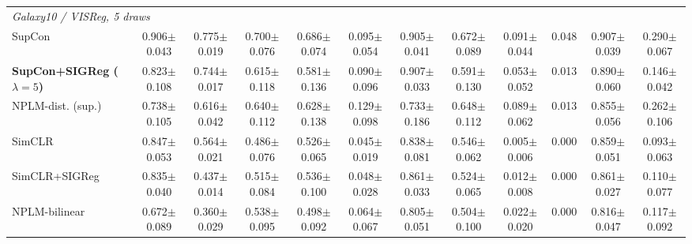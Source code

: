 \begin{landscape}
\begin{center}
\begin{longtable}{lccccccccccc}
\multicolumn{12}{l}{\emph{Galaxy10 / VISReg, 5 draws}} \\
\quad SupCon & 0.906$\pm$0.043 & 0.775$\pm$0.019 & 0.700$\pm$0.076 & 0.686$\pm$0.074 & 0.095$\pm$0.054 & 0.905$\pm$0.041 & 0.672$\pm$0.089 & 0.091$\pm$0.044 & 0.048 & 0.907$\pm$0.039 & 0.290$\pm$0.067 \\
\quad \textbf{SupCon+SIGReg ($\lambda{=}5$)} & 0.823$\pm$0.108 & 0.744$\pm$0.017 & 0.615$\pm$0.118 & 0.581$\pm$0.136 & 0.090$\pm$0.096 & 0.907$\pm$0.033 & 0.591$\pm$0.130 & 0.053$\pm$0.052 & 0.013 & 0.890$\pm$0.060 & 0.146$\pm$0.042 \\
\quad NPLM-dist. (sup.) & 0.738$\pm$0.105 & 0.616$\pm$0.042 & 0.640$\pm$0.112 & 0.628$\pm$0.138 & 0.129$\pm$0.098 & 0.733$\pm$0.186 & 0.648$\pm$0.112 & 0.089$\pm$0.062 & 0.013 & 0.855$\pm$0.056 & 0.262$\pm$0.106 \\
\quad SimCLR & 0.847$\pm$0.053 & 0.564$\pm$0.021 & 0.486$\pm$0.076 & 0.526$\pm$0.065 & 0.045$\pm$0.019 & 0.838$\pm$0.081 & 0.546$\pm$0.062 & 0.005$\pm$0.006 & 0.000 & 0.859$\pm$0.051 & 0.093$\pm$0.063 \\
\quad SimCLR+SIGReg & 0.835$\pm$0.040 & 0.437$\pm$0.014 & 0.515$\pm$0.084 & 0.536$\pm$0.100 & 0.048$\pm$0.028 & 0.861$\pm$0.033 & 0.524$\pm$0.065 & 0.012$\pm$0.008 & 0.000 & 0.861$\pm$0.027 & 0.110$\pm$0.077 \\
\quad NPLM-bilinear & 0.672$\pm$0.089 & 0.360$\pm$0.029 & 0.538$\pm$0.095 & 0.498$\pm$0.092 & 0.064$\pm$0.067 & 0.805$\pm$0.051 & 0.504$\pm$0.100 & 0.022$\pm$0.020 & 0.000 & 0.816$\pm$0.047 & 0.117$\pm$0.092 \\
\end{longtable}
\end{center}
\end{landscape}
